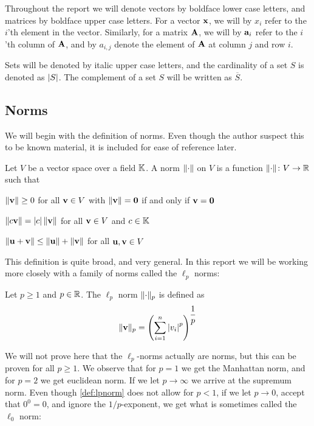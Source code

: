 Throughout the report we will denote vectors by boldface lower case letters, and matrices by boldface upper case letters. For a vector $ \mathbf{x} $, we will by $ x_{i} $ refer to the $ i $'th element in the vector. Similarly, for a matrix $ \mathbf{A} $, we will by $ \mathbf{a}_{i} $ refer to the $ i $'th  column of $ \mathbf{A} $, and by $ a_{i, j} $ denote the element of $ \mathbf{A} $ at column $ j $ and row $ i $.

Sets will be denoted by italic upper case letters, and the cardinality of a set $ S $ is denoted as $ \left|S\right| $. The complement of a set $ S $ will be written as $ \overline{S} $. 

\subsection{Norms}
We will begin with the definition of norms. Even though the author suspect this to be known material, it is included for ease of reference later.

\begin{definition} \label{def:norm}
	Let $ V $ be a vector space over a field $ \mathbb{K} $.  A norm $ \lVert\cdot\rVert $ on $ V $ is a function $ \lVert\cdot\rVert\colon V \to\mathbb{R} $ such that
	\begin{subdef}
		\item $ \lVert\mathbf{v}\rVert \geq 0 $ for all $ \mathbf{v} \in V $ with $ \lVert\mathbf{v}\rVert = \mathbf{0} $ if and only if $ \mathbf{v} = \mathbf{0} $
		\item $ \lVert c\mathbf{v}\rVert = \left|c\right|\lVert\mathbf{v}\rVert $ for all $ \mathbf{v} \in V $ and $ c \in \mathbb{K} $
		\item $ \lVert\mathbf{u} + \mathbf{v}\rVert \leq \lVert\mathbf{u}\rVert + \lVert\mathbf{v}\rVert $ for all $ \mathbf{u},  \mathbf{v} \in V $
	\end{subdef}
\end{definition}

This definition is quite broad, and very general. In this report we will be working more closely with a family of norms called the $ \ell_{p} $ norms:

\begin{definition} \label{def:lpnorm}
	Let $ p \geq 1 $ and $ p \in \mathbb{R} $. The $ \ell_{p} $ norm $ \lVert\cdot\rVert_{p} $ is defined as
	\[
		\lVert\mathbf{v}\rVert_{p} = \left( \sum_{i=1}^{n} \left|v_{i}\right|^{p} \right)^{\dfrac{1}{p}}
	\]
\end{definition}

We will not prove here that the $ \ell_{p} $-norms actually are norms, but this can be proven for all $ p\geq 1 $. We observe that for $ p=1 $ we get the Manhattan norm, and for $ p=2 $ we get euclidean norm. If we let $ p\to\infty $ we arrive at the supremum norm. Even though \cref{def:lpnorm} does not allow for $ p < 1 $, if we let $ p\to0 $, accept that $ 0^{0} = 0 $, and ignore the $ 1/p $-exponent, we get what is sometimes called the $ \ell_{0} $ norm:

